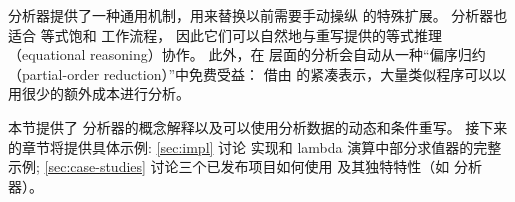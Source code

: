 \eclass 分析器提供了一种通用机制，用来替换以前需要手动操纵 \egraph 的特殊扩展。
\eclass 分析器也适合 等式饱和 工作流程，
  因此它们可以自然地与重写提供的等式推理（equational reasoning）协作。
此外，在 \egraph 层面的分析会自动从一种“偏序归约（partial-order reduction）”中免费受益：
  借由 \egraph 的紧凑表示，大量类似程序可以以用很少的额外成本进行分析。

本节提供了 \eclass 分析器的概念解释以及可以使用分析数据的动态和条件重写。
接下来的章节将提供具体示例:
  \autoref{sec:impl} 讨论 \egg 实现和 lambda 演算中部分求值器的完整示例;
  \autoref{sec:case-studies} 讨论三个已发布项目如何使用
  \egg 及其独特特性（如 \eclass 分析器）。




